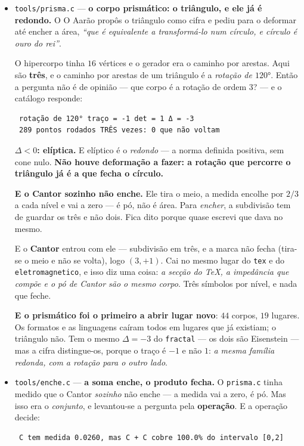 \documentclass[11pt]{article}
\newcommand{\code}[1]{\texttt{\small #1}}
\theoremstyle{plain}
\theoremstyle{remark}
\begin{document}
\begin{itemize}
\item \code{tools/prisma.c} --- \textbf{o corpo prismático: o triângulo, e ele já é redondo.} O
O Aarão propôs o triângulo como cifra e pediu para o deformar até encher a área, \emph{``que é
equivalente a transformá-lo num círculo, e círculo é ouro do rei''}.

O hipercorpo tinha $16$ vértices e o gerador era o caminho por arestas. Aqui são \textbf{três}, e
o caminho por arestas de um triângulo é a \emph{rotação de $120°$}. Então a pergunta não é de
opinião --- que corpo é a rotação de ordem $3$? --- e o catálogo responde:

\begin{verbatim}
 rotação de 120° traço = -1 det = 1 Δ = -3
 289 pontos rodados TRÊS vezes: 0 que não voltam
\end{verbatim}

\textbf{$\Delta < 0$: elíptica.} E elíptico é o \emph{redondo} --- a norma definida positiva, sem
cone nulo. \textbf{Não houve deformação a fazer: a rotação que percorre o triângulo já é a que
fecha o círculo.}

\textbf{E o Cantor sozinho não enche.} Ele tira o meio, a medida encolhe por $2/3$ a cada nível e
vai a zero --- é pó, não é área. Para \emph{encher}, a subdivisão tem de guardar os três e não
dois. Fica dito porque quase escrevi que dava no mesmo.

E o \textbf{Cantor} entrou com ele --- subdivisão em três, e a marca não fecha (tira-se o meio e
não se volta), logo $(3,+1)$. Cai no mesmo lugar do \code{tex} e do \code{eletromagnetico}, e isso
diz uma coisa: \emph{a secção do \TeX{}, a impedância que compõe e o pó de Cantor são o mesmo
corpo}. Três símbolos por nível, e nada que feche.

\textbf{E o prismático foi o primeiro a abrir lugar novo}: $44$ corpos, $19$ lugares. Os formatos e
as linguagens caíram todos em lugares que já existiam; o triângulo não. Tem o mesmo $\Delta = -3$
do \code{fractal} --- os dois são Eisenstein --- mas a cifra distingue-os, porque o traço é $-1$ e
não $1$: \emph{a mesma família redonda, com a rotação para o outro lado}.

\item \code{tools/enche.c} --- \textbf{a soma enche, o produto fecha.} O \code{prisma.c} tinha
medido que o Cantor \emph{sozinho} não enche --- a medida vai a zero, é pó. Mas isso era o
\emph{conjunto}, e levantou-se a pergunta pela \textbf{operação}. E a operação decide:

\begin{verbatim}
 C tem medida 0.0260, mas C + C cobre 100.0% do intervalo [0,2]
\end{verbatim}


\end{itemize}
\end{document}
